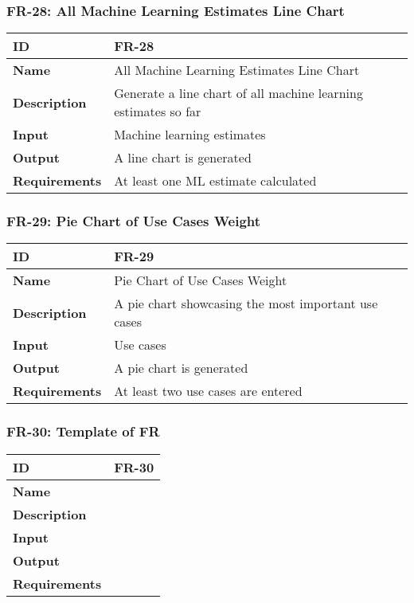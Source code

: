 \subsubsection{FR-28: All Machine Learning Estimates Line Chart}
\begin{center}
  \begin{tabularx}{\textwidth}{|l|X|}
      \hline
      \textbf{ID} & FR-28 \\
      \hline
      \textbf{Name} & All Machine Learning Estimates Line Chart \\
      \hline
      \textbf{Description} & Generate a line chart of all machine learning estimates so far \\
      \hline
      \textbf{Input} & Machine learning estimates \\
      \hline
      \textbf{Output} & A line chart is generated \\
      \hline
      \textbf{Requirements} & At least one ML estimate calculated \\
      \hline
  \end{tabularx}
\end{center}

\subsubsection{FR-29: Pie Chart of Use Cases Weight}
\begin{center}
  \begin{tabularx}{\textwidth}{|l|X|}
      \hline
      \textbf{ID} & FR-29 \\
      \hline
      \textbf{Name} & Pie Chart of Use Cases Weight \\
      \hline
      \textbf{Description} & A pie chart showcasing the most important use cases \\
      \hline
      \textbf{Input} & Use cases \\
      \hline
      \textbf{Output} & A pie chart is generated \\
      \hline
      \textbf{Requirements} & At least two use cases are entered \\
      \hline
  \end{tabularx}
\end{center}

\subsubsection{FR-30: Template of FR}
\begin{center}
  \begin{tabularx}{\textwidth}{|l|X|}
      \hline
      \textbf{ID} & FR-30 \\
      \hline
      \textbf{Name} &  \\
      \hline
      \textbf{Description} &  \\
      \hline
      \textbf{Input} &  \\
      \hline
      \textbf{Output} &  \\
      \hline
      \textbf{Requirements} &  \\
      \hline
  \end{tabularx}
\end{center}